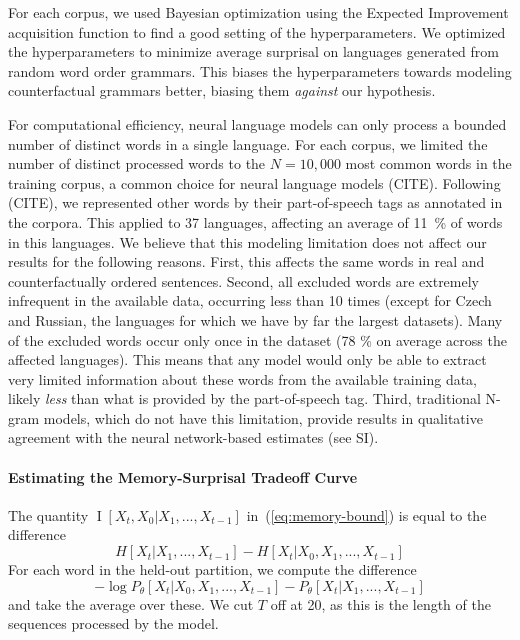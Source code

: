 \documentclass[11pt,letterpaper]{article}
\begin{document}
For each corpus, we used Bayesian optimization using the Expected Improvement acquisition function \citep{snoek-practical-2012} to find a good setting of the hyperparameters.
We optimized the hyperparameters to minimize average surprisal on languages generated from random word order grammars.
This biases the hyperparameters towards modeling counterfactual grammars better, biasing them \emph{against} our hypothesis.

For computational efficiency, neural language models can only process a bounded number of distinct words in a single language.
For each corpus, we limited the number of distinct processed words to the $N=10,000$ most common words in the training corpus, a common choice for neural language models (CITE).
Following (CITE), we represented other words by their part-of-speech tags as annotated in the corpora.
This applied to 37 languages, affecting an average of 11~\% of words in this languages.
We believe that this modeling limitation does not affect our results for the following reasons.
First, this affects the same words in real and counterfactually ordered sentences.
Second, all excluded words are extremely infrequent in the available data, occurring less than 10 times (except for Czech and Russian, the languages for which we have by far the largest datasets).
Many of the excluded words occur only once in the dataset (78 \% on average across the affected languages).
This means that any model would only be able to extract very limited information about these words from the available training data, likely \emph{less} than what is provided by the part-of-speech tag.
Third, traditional N-gram models, which do not have this limitation, provide results in qualitative agreement with the neural network-based estimates (see SI).



\paragraph{Estimating the Memory-Surprisal Tradeoff Curve}



The quantity $\operatorname{I}[X_t, X_0 | X_1, ..., X_{t-1}]$ in~(\ref{eq:memory-bound}) is equal to the difference 
\begin{equation}
H[X_t|X_1, ..., X_{t-1}] - H[X_t|X_0, X_1, ..., X_{t-1}]
\end{equation}
For each word in the held-out partition, we compute the difference
\begin{equation}
	-\log P_\theta[X_t | X_0, X_1, ..., X_{t-1}] - P_\theta[X_t | X_1, ..., X_{t-1}]
\end{equation}
and take the average over these.
We cut $T$ off at 20, as this is the length of the sequences processed by the model.
\end{document}
